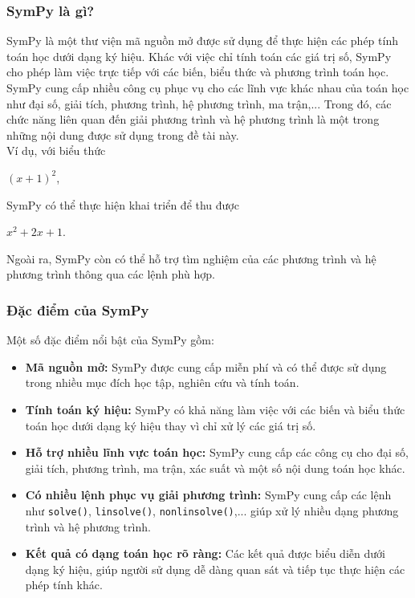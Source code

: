 \documentclass[13pt,a4paper]{article}
\begin{document}
\subsubsection{SymPy là gì?}
SymPy là một thư viện mã nguồn mở được sử dụng để thực hiện các phép tính toán học dưới dạng ký hiệu. Khác với việc chỉ tính toán các giá trị số, SymPy cho phép làm việc trực tiếp với các biến, biểu thức và phương trình toán học.\\
\noindent SymPy cung cấp nhiều công cụ phục vụ cho các lĩnh vực khác nhau của toán học như đại số, giải tích, phương trình, hệ phương trình, ma trận,... Trong đó, các chức năng liên quan đến giải phương trình và hệ phương trình là một trong những nội dung được sử dụng trong đề tài này.\\
\noindent Ví dụ, với biểu thức
\begin{center}
    $(x+1)^2$,
\end{center}
SymPy có thể thực hiện khai triển để thu được
\begin{center}
    $x^2+2x+1.$
\end{center}
Ngoài ra, SymPy còn có thể hỗ trợ tìm nghiệm của các phương trình và hệ phương trình thông qua các lệnh phù hợp.
\subsubsection{Đặc điểm của SymPy}
Một số đặc điểm nổi bật của SymPy gồm:
\begin{itemize}[itemsep=4pt, parsep=2pt]
    \item \textbf{Mã nguồn mở:} SymPy được cung cấp miễn phí và có thể được sử dụng trong nhiều mục đích học tập, nghiên cứu và tính toán.
    \item \textbf{Tính toán ký hiệu:} SymPy có khả năng làm việc với các biến và biểu thức toán học dưới dạng ký hiệu thay vì chỉ xử lý các giá trị số.
    \item \textbf{Hỗ trợ nhiều lĩnh vực toán học:} SymPy cung cấp các công cụ cho đại số, giải tích, phương trình, ma trận, xác suất và một số nội dung toán học khác.
    \item \textbf{Có nhiều lệnh phục vụ giải phương trình:} SymPy cung cấp các lệnh như \texttt{solve()}, \texttt{linsolve()}, \texttt{nonlinsolve()},... giúp xử lý nhiều dạng phương trình và hệ phương trình.
    \item \textbf{Kết quả có dạng toán học rõ ràng:} Các kết quả được biểu diễn dưới dạng ký hiệu, giúp người sử dụng dễ dàng quan sát và tiếp tục thực hiện các phép tính khác.
\end{itemize}
\end{document}

